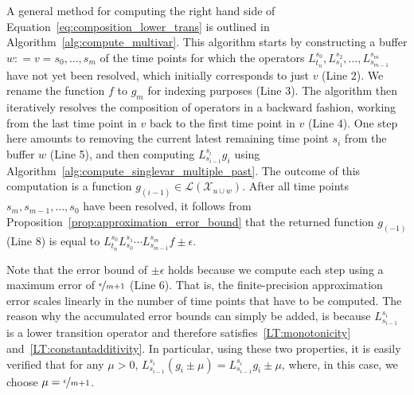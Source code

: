 \documentclass[10pt,a4paper]{paper}
\theoremstyle{definition}
\newcommand{\states}{\mathcal{X}}
\newcommand{\gambles}{\mathcal{L}}
\newcommand{\coloneqq}{:\!=}
\begin{document}
A general method for computing the right hand side of Equation~\eqref{eq:composition_lower_trans} is outlined in Algorithm~\ref{alg:compute_multivar}. This algorithm starts by constructing a buffer $w\coloneqq v=s_0,\ldots,s_m$ of the time points for which the operators $L_{t_n}^{s_0},L_{s_1}^{s_2},\ldots,L_{s_{m-1}}^{s_m}$ have not yet been resolved, which initially corresponds to just $v$ (Line 2). We rename the function $f$ to $g_m$ for indexing purposes (Line 3). The algorithm then iteratively resolves the composition of operators in a backward fashion, working from the last time point in $v$ back to the first time point in $v$ (Line 4). One step here amounts to removing the current latest remaining time point $s_i$ from the buffer $w$ (Line 5), and then computing $L_{s_{i-1}}^{s_i}g_i$ using Algorithm~\ref{alg:compute_singlevar_multiple_past}. The outcome of this computation is a function $g_{(i-1)}\in\gambles(\states_{u\cup w})$. %
After all time points $s_m,s_{m-1},\ldots,s_0$ have been resolved, it follows from Proposition~\ref{prop:approximation_error_bound} that the returned function $g_{(-1)}$ (Line 8) is equal to $L_{t_n}^{s_0}L_{s_0}^{s_1}\cdots L_{s_{m-1}}^{s_m}f\pm\epsilon$.

Note that the error bound of $\pm\epsilon$ holds because we compute each step using a maximum error of $\nicefrac{\epsilon}{m+1}$ (Line 6). That is, the finite-precision approximation error scales linearly in the number of time points that have to be computed. The reason why the accumulated error bounds can simply be added, is because $L_{s_{i-1}}^{s_i}$ is a lower transition operator and therefore satisfies~\ref{LT:monotonicity} and~\ref{LT:constantadditivity}. In particular, using these two properties, it is easily verified that for any $\mu>0$, $L_{s_{i-1}}^{s_i}(g_i\pm\mu)=L_{s_{i-1}}^{s_i}g_i\pm\mu$, where, in this case, we choose $\mu=\nicefrac{\epsilon}{m+1}$.
\end{document}
